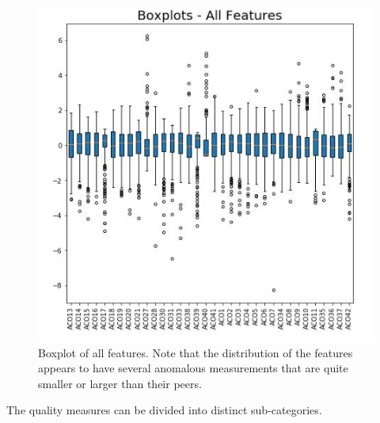 \documentclass[conference]{IEEEtran}
\begin{document}
\begin{figure}[H]
    \centering
    \includegraphics{BoxPlots_ALL.jpg}
    \caption{Boxplot of all features.  Note that the distribution of the features appears to have several anomalous measurements that are quite smaller or larger than their peers.}
    \label{fig:boxall}
\end{figure}

The quality measures can be divided into distinct sub-categories. 
\end{document}

